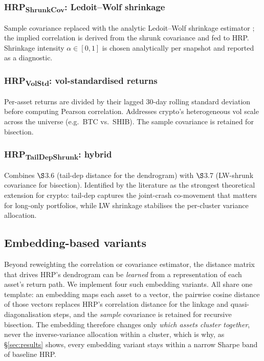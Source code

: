 \documentclass[11pt,a4paper]{article}
\begin{document}
\subsubsection{HRP\textsubscript{ShrunkCov}: Ledoit--Wolf shrinkage}
Sample covariance replaced with the analytic Ledoit--Wolf shrinkage
estimator \citep{ledoitwolf2003shrunk,ledoitwolf2004wellcond}; the
implied correlation is derived from the shrunk covariance and fed
to HRP. Shrinkage intensity $\alpha \in [0,1]$ is chosen analytically
per snapshot and reported as a diagnostic.

\subsubsection{HRP\textsubscript{VolStd}: vol-standardised returns}
Per-asset returns are divided by their lagged 30-day rolling standard
deviation before computing Pearson correlation. Addresses crypto's
heterogeneous vol scale across the universe (e.g.\ BTC vs.\ SHIB).
The sample covariance is retained for bisection.

\subsubsection{HRP\textsubscript{TailDepShrunk}: hybrid}
Combines $\S$3.6 (tail-dep distance for the dendrogram) with $\S$3.7
(LW-shrunk covariance for bisection). Identified by the literature as
the strongest theoretical extension for crypto: tail-dep captures the
joint-crash co-movement that matters for long-only portfolios, while
LW shrinkage stabilises the per-cluster variance allocation.

\subsection{Embedding-based variants}
\label{sec:methods-emb}

Beyond reweighting the correlation or covariance estimator, the distance
matrix that drives HRP's dendrogram can be \emph{learned} from a
representation of each asset's return path. We implement four such
embedding variants. All share one template: an embedding maps each asset
to a vector, the pairwise cosine distance of those vectors replaces HRP's
correlation distance for the linkage and quasi-diagonalisation steps, and
the \emph{sample} covariance is retained for recursive bisection. The
embedding therefore changes only \emph{which assets cluster together},
never the inverse-variance allocation within a cluster, which is why,
as \S\ref{sec:results} shows, every embedding variant stays within a
narrow Sharpe band of baseline HRP.
\end{document}
